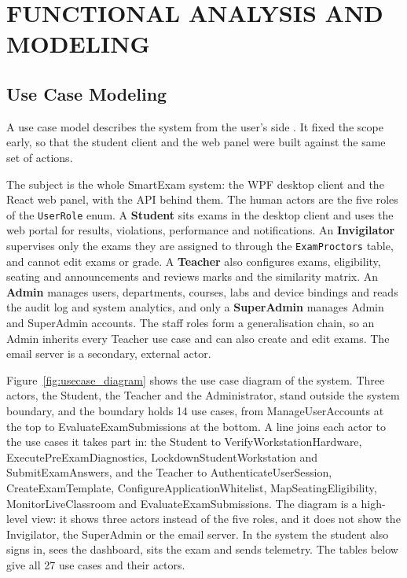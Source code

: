 \chapter{FUNCTIONAL ANALYSIS AND MODELING}

\section{Use Case Modeling}

A use case model describes the system from the user's side \cite{uml_systems_analysis}. It fixed the scope early, so that the student client and the web panel were built against the same set of actions.

The subject is the whole SmartExam system: the WPF desktop client and the React web panel, with the API behind them. The human actors are the five roles of the \texttt{UserRole} enum. A \textbf{Student} sits exams in the desktop client and uses the web portal for results, violations, performance and notifications. An \textbf{Invigilator} supervises only the exams they are assigned to through the \texttt{ExamProctors} table, and cannot edit exams or grade. A \textbf{Teacher} also configures exams, eligibility, seating and announcements and reviews marks and the similarity matrix. An \textbf{Admin} manages users, departments, courses, labs and device bindings and reads the audit log and system analytics, and only a \textbf{SuperAdmin} manages Admin and SuperAdmin accounts. The staff roles form a generalisation chain, so an Admin inherits every Teacher use case and can also create and edit exams. The email server is a secondary, external actor.

Figure~\ref{fig:usecase_diagram} shows the use case diagram of the system. Three actors, the Student, the Teacher and the Administrator, stand outside the system boundary, and the boundary holds 14 use cases, from ManageUserAccounts at the top to EvaluateExamSubmissions at the bottom. A line joins each actor to the use cases it takes part in: the Student to VerifyWorkstationHardware, ExecutePreExamDiagnostics, LockdownStudentWorkstation and SubmitExamAnswers, and the Teacher to AuthenticateUserSession, CreateExamTemplate, ConfigureApplicationWhitelist, MapSeatingEligibility, MonitorLiveClassroom and EvaluateExamSubmissions. The diagram is a high-level view: it shows three actors instead of the five roles, and it does not show the Invigilator, the SuperAdmin or the email server. In the system the student also signs in, sees the dashboard, sits the exam and sends telemetry. The tables below give all 27 use cases and their actors.

